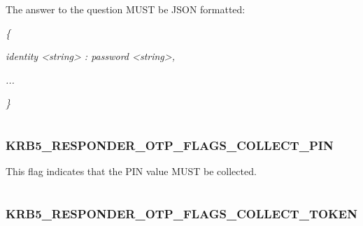 \documentclass[letterpaper,10pt,english]{sphinxmanual}
\begin{document}
The answer to the question MUST be JSON formatted:

\emph{\{}

\emph{identity \textless{}string\textgreater{} : password \textless{}string\textgreater{},}

\emph{...}

\emph{\}}

\begin{tabulary}{\linewidth}{|L|L|}
\hline

 & 
\\\hline
\end{tabulary}



\subsubsection{KRB5\_RESPONDER\_OTP\_FLAGS\_COLLECT\_PIN}
\label{appdev/refs/macros/KRB5_RESPONDER_OTP_FLAGS_COLLECT_PIN:krb5-responder-otp-flags-collect-pin-data}\label{appdev/refs/macros/KRB5_RESPONDER_OTP_FLAGS_COLLECT_PIN::doc}\label{appdev/refs/macros/KRB5_RESPONDER_OTP_FLAGS_COLLECT_PIN:krb5-responder-otp-flags-collect-pin}

\begin{fulllineitems}
\label{appdev/refs/macros/KRB5_RESPONDER_OTP_FLAGS_COLLECT_PIN:KRB5_RESPONDER_OTP_FLAGS_COLLECT_PIN}
\end{fulllineitems}


This flag indicates that the PIN value MUST be collected.

\begin{tabulary}{\linewidth}{|L|L|}
\hline

 & 
\\\hline
\end{tabulary}



\subsubsection{KRB5\_RESPONDER\_OTP\_FLAGS\_COLLECT\_TOKEN}
\label{appdev/refs/macros/KRB5_RESPONDER_OTP_FLAGS_COLLECT_TOKEN:krb5-responder-otp-flags-collect-token-data}\label{appdev/refs/macros/KRB5_RESPONDER_OTP_FLAGS_COLLECT_TOKEN:krb5-responder-otp-flags-collect-token}\label{appdev/refs/macros/KRB5_RESPONDER_OTP_FLAGS_COLLECT_TOKEN::doc}
\end{document}
